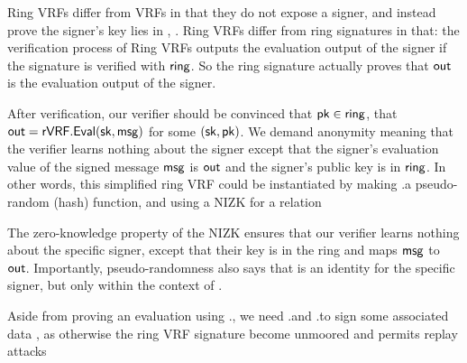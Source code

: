 Ring VRFs differ from VRFs in that they do not expose a signer,
and instead prove the signer's key lies in  \ring,
.
Ring VRFs differ from ring signatures in that: the verification process of Ring VRFs outputs the evaluation output \Out of the signer if the signature is verified with $ \ring $. So  the ring signature  actually proves that $ \Out $ is the evaluation output of the signer. 

After  verification, our verifier should be convinced that $\pk \in \ring$, that
$\Out = \rVRF.\Eval(\sk,\msg)$ for some $(\sk,\pk) \eprint{\leftarrow \rVRF.\KeyGen}{}$. We demand anonymity meaning that the verifier learns nothing about the signer except that the signer's evaluation value of the signed message $ \msg $ is $ \Out $ and the signer's public key is in $ \ring $.
In other words, this simplified ring VRF could be instantiated by making
\rVRF.\Eval a pseudo-random (hash) function, and using a NIZK for a relation



The zero-knowledge property of the NIZK ensures that our verifier learns nothing about the specific
signer, except that their key is in the ring and maps $\msg$ to $\Out$.
Importantly, pseudo-randomness also says that \Out is an identity
for the specific signer, but only within the context of \msg.


Aside from proving an evaluation using \rVRF.\Eval, 
we  need \rVRF.\Sign and \rVRF.\Verify to sign some associated data \aux,
as otherwise the ring VRF signature become unmoored and permits replay attacks 

